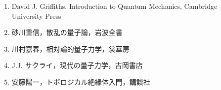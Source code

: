 \documentclass{report}
\begin{document}
  \begin{enumerate}
    \item David J. Griffiths, Introduction to Quantum Mechanics, Cambridge University Press
    \item 砂川重信，散乱の量子論，岩波全書
    \item 川村嘉春，相対論的量子力学，裳華房
    \item J.J. サクライ，現代の量子力学，吉岡書店
    \item 安藤陽一，トポロジカル絶縁体入門，講談社
  \end{enumerate}
\end{document}
